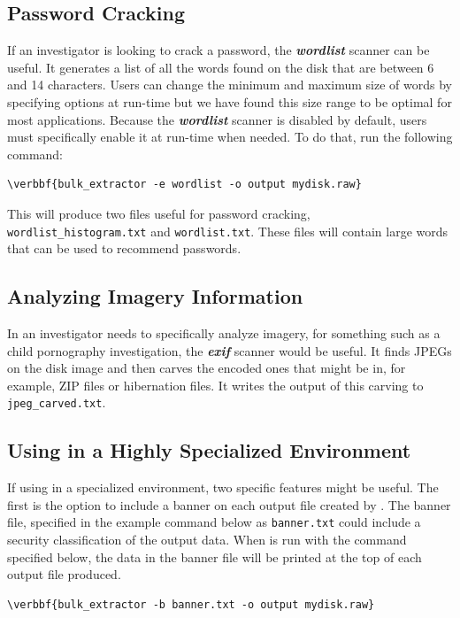 \documentclass[11pt]{article} %
\begin{document}
\subsection{Password Cracking}
\label{PasswordCracking}
If an investigator is looking to crack a password, the \textbf{\textit{wordlist}} scanner can be useful. It generates a list of all the words found on the disk that are between 6 and 14 characters. Users can change the minimum and maximum size of words by specifying options at run-time but we have found this size range to be optimal for most applications. Because the \textbf{\textit{wordlist}} scanner is disabled by default, users must specifically enable it at run-time when needed. To do that, run the following command:
\begin{Verbatim}[commandchars=\\\{\}]
\verbbf{bulk_extractor -e wordlist -o output mydisk.raw}
\end{Verbatim}
This will produce two files useful for password cracking, \texttt{wordlist\_histogram.txt} and \texttt{wordlist.txt}.  These files will contain large words that can be used to recommend passwords.

\subsection{Analyzing Imagery Information}
\label{imagery}
In an investigator needs to specifically analyze imagery, for something such as a child pornography investigation, the \textbf{\textit{exif}} scanner would be useful. It finds JPEGs on the disk image and then carves the encoded ones that might be in, for example, ZIP files or hibernation files. It writes the output of this carving to \texttt{jpeg\_carved.txt}.

\subsection{Using \bulk in a Highly Specialized Environment}
If using \bulk in a specialized environment, two specific features might be useful.  The first is the option to include a banner on each output file created by \bulk. The banner file, specified in the example command below as \texttt{banner.txt} could include a security classification of the output data. When \bulk is run with the command specified below, the data in the banner file will be printed at the top of each output file produced.
\begin{Verbatim}[commandchars=\\\{\}]
\verbbf{bulk_extractor -b banner.txt -o output mydisk.raw}
\end{Verbatim}
\end{document}
